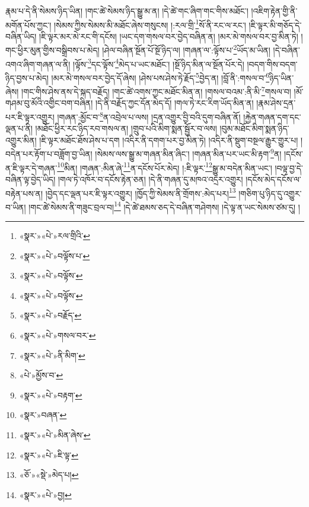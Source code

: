 རྣམ་པ་དེ་ནི་སེམས་ཉིད་ཡིན། །གང་ཚེ་སེམས་ཉིད་སྒྱུ་མ་ན། །དེ་ཚེ་གང་ཞིག་གང་གིས་མཐོང་། །འཇིག་རྟེན་གྱི་ནི་མགོན་པོས་ཀྱང་། །སེམས་ཀྱིས་སེམས་མི་མཐོང་ཞེས་གསུངས། །:རལ་གྲི་\footnote{«སྣར་»«པེ་»རལ་གྲིའི་}སོ་ནི་རང་ལ་རང་། །ཇི་ལྟར་མི་གཅོད་དེ་བཞིན་ཡིད། །ཇི་ལྟར་མར་མེ་རང་གི་དངོས། །ཡང་དག་གསལ་བར་བྱེད་བཞིན་ན། །མར་མེ་གསལ་བར་བྱ་མིན་ཏེ། །གང་ཕྱིར་མུན་གྱིས་བསྒྲིབས་པ་མེད། །ཤེལ་བཞིན་སྔོན་པོ་སྔོ་ཉིད་ལ། །གཞན་ལ་:ལྟོས་པ་\footnote{«སྣར་»«པེ་»བལྟོས་པ་}ཡོད་མ་ཡིན། །དེ་བཞིན་འགའ་ཞིག་གཞན་ལ་ནི། །ལྟོས་\footnote{«སྣར་»«པེ་»བལྟོས་}དང་ལྟོས་\footnote{«སྣར་»«པེ་»བལྟོས་}མེད་པ་ཡང་མཐོང་། །སྔོ་ཉིད་མིན་ལ་སྔོན་པོར་དེ། །བདག་གིས་བདག་ཉིད་བྱས་པ་མེད། །མར་མེ་གསལ་བར་བྱེད་དོ་ཞེས། །ཤེས་པས་ཤེས་ཏེ་རྗོད་\footnote{«སྣར་»«པེ་»བརྗོད་}བྱེད་ན། །བློ་ནི་:གསལ་བ་\footnote{«སྣར་»«པེ་»གསལ་བར་}ཉིད་ཡིན་ཞེས། །གང་གིས་ཤེས་ནས་དེ་སྐད་བརྗོད། །གང་ཚེ་འགས་ཀྱང་མཐོང་མིན་ན། །གསལ་བའམ་:ནི་མི་\footnote{«སྣར་»«པེ་»ནི་མིག་}གསལ་བ། །མོ་གཤམ་བུ་མོའི་འགྱིང་བག་བཞིན། །དེ་ནི་བརྗོད་ཀྱང་དོན་མེད་དོ། །གལ་ཏེ་རང་རིག་ཡོད་མིན་ན། །རྣམ་ཤེས་དྲན་པར་ཇི་ལྟར་འགྱུར། །གཞན་:མྱོང་བ་\footnote{«པེ་»མྱོས་བ་}ན་འབྲེལ་པ་ལས། །དྲན་འགྱུར་བྱི་བའི་དུག་བཞིན་ནོ། །རྐྱེན་གཞན་དག་དང་ལྡན་པ་ནི། །མཐོང་ཕྱིར་རང་ཉིད་རབ་གསལ་ན། །གྲུབ་པའི་མིག་སྨན་སྦྱོར་བ་ལས། །བུམ་མཐོང་མིག་སྨན་ཉིད་འགྱུར་མིན། །ཇི་ལྟར་མཐོང་ཐོས་ཤེས་པ་དག །འདིར་ནི་དགག་པར་བྱ་མིན་ཏེ། །འདིར་ནི་སྡུག་བསྔལ་རྒྱུར་གྱུར་པ། །བདེན་པར་རྟོག་པ་བཟློག་བྱ་ཡིན། །སེམས་ལས་སྒྱུ་མ་གཞན་མིན་ཞིང་། །གཞན་མིན་པར་ཡང་མི་རྟག་\footnote{«སྣར་»«པེ་»བརྟག་}ན། །དངོས་ན་ཇི་ལྟར་དེ་གཞན་\footnote{«སྣར་»བཞན་}མིན། །གཞན་:མིན་ཞེ་\footnote{«སྣར་»«པེ་»མིན་ཞེས་}ན་དངོས་པོར་མེད། །:ཇི་ལྟར་\footnote{«སྣར་»«པེ་»ཇི་ལྟ་}སྒྱུ་མ་བདེན་མིན་ཡང་། །བལྟ་བྱ་དེ་བཞིན་ལྟ་བྱེད་ཡིད། །གལ་ཏེ་འཁོར་བ་དངོས་རྟེན་ཅན། །དེ་ནི་གཞན་དུ་མཁའ་འདྲར་འགྱུར། །དངོས་མེད་དངོས་ལ་བརྟེན་པས་ན། །བྱེད་དང་ལྡན་པར་ཇི་ལྟར་འགྱུར། །ཁྱོད་ཀྱི་སེམས་ནི་གྲོགས་:མེད་པར།\footnote{«ཅོ་»«སྡེ་»མེད་པ།} །གཅིག་པུ་ཉིད་དུ་འགྱུར་བ་ཡིན། །གང་ཚེ་སེམས་ནི་གཟུང་བྲལ་བ།\footnote{«སྣར་»«པེ་»བྱ།} །དེ་ཚེ་ཐམས་ཅད་དེ་བཞིན་གཤེགས། །དེ་ལྟ་ན་ཡང་སེམས་ཙམ་དུ། །
